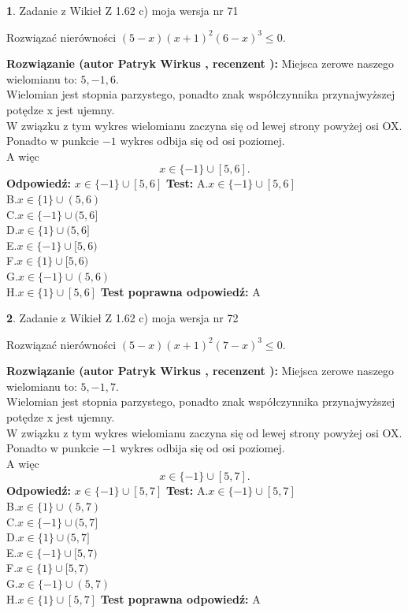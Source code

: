 \documentclass[12pt, a4paper]{article}
\theoremstyle{definition} %
\newtheorem{zad}{}
\newcommand{\zadStart}[1]{\begin{zad}#1\newline}
\newcommand{\zadStop}{\end{zad}}
\newcommand{\rozwStart}[2]{\noindent \textbf{Rozwiązanie (autor #1 , recenzent #2): }\newline}
\newcommand{\rozwStop}{\newline}
\newcommand{\odpStart}{\noindent \textbf{Odpowiedź:}\newline}
\newcommand{\odpStop}{\newline}
\newcommand{\testStart}{\noindent \textbf{Test:}\newline}
\newcommand{\testStop}{\newline}
\newcommand{\kluczStart}{\noindent \textbf{Test poprawna odpowiedź:}\newline}
\newcommand{\kluczStop}{\newline}
\begin{document}
\zadStart{Zadanie z Wikieł Z 1.62 c) moja wersja nr 71}

Rozwiązać nierówności $(5-x)(x+1)^{2}(6-x)^{3}\le0$.
\zadStop
\rozwStart{Patryk Wirkus}{}
Miejsca zerowe naszego wielomianu to: $5, -1, 6$.\\
Wielomian jest stopnia parzystego, ponadto znak współczynnika przy\linebreak najwyższej potędze x jest ujemny.\\ W związku z tym wykres wielomianu zaczyna się od lewej strony powyżej osi OX.\\
Ponadto w punkcie $-1$ wykres odbija się od osi poziomej.\\
A więc $$x \in \{-1\} \cup [5,6].$$
\rozwStop
\odpStart
$x \in \{-1\} \cup [5,6]$
\odpStop
\testStart
A.$x \in \{-1\} \cup [5,6]$\\
B.$x \in \{1\} \cup (5,6)$\\
C.$x \in \{-1\} \cup (5,6]$\\
D.$x \in \{1\} \cup (5,6]$\\
E.$x \in \{-1\} \cup [5,6)$\\
F.$x \in \{1\} \cup [5,6)$\\
G.$x \in \{-1\} \cup (5,6)$\\
H.$x \in \{1\} \cup [5,6]$
\testStop
\kluczStart
A
\kluczStop



\zadStart{Zadanie z Wikieł Z 1.62 c) moja wersja nr 72}

Rozwiązać nierówności $(5-x)(x+1)^{2}(7-x)^{3}\le0$.
\zadStop
\rozwStart{Patryk Wirkus}{}
Miejsca zerowe naszego wielomianu to: $5, -1, 7$.\\
Wielomian jest stopnia parzystego, ponadto znak współczynnika przy\linebreak najwyższej potędze x jest ujemny.\\ W związku z tym wykres wielomianu zaczyna się od lewej strony powyżej osi OX.\\
Ponadto w punkcie $-1$ wykres odbija się od osi poziomej.\\
A więc $$x \in \{-1\} \cup [5,7].$$
\rozwStop
\odpStart
$x \in \{-1\} \cup [5,7]$
\odpStop
\testStart
A.$x \in \{-1\} \cup [5,7]$\\
B.$x \in \{1\} \cup (5,7)$\\
C.$x \in \{-1\} \cup (5,7]$\\
D.$x \in \{1\} \cup (5,7]$\\
E.$x \in \{-1\} \cup [5,7)$\\
F.$x \in \{1\} \cup [5,7)$\\
G.$x \in \{-1\} \cup (5,7)$\\
H.$x \in \{1\} \cup [5,7]$
\testStop
\kluczStart
A
\kluczStop
\end{document}
